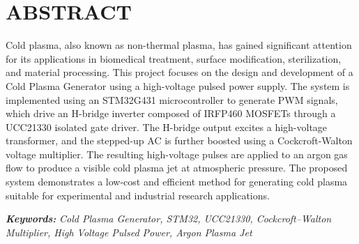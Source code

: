  \parbox[1in]{4in}{}

\section*{ABSTRACT} 

\parbox[1in]{2in}{ }


Cold plasma, also known as non-thermal plasma, has gained significant attention for its applications in biomedical treatment, surface modification, sterilization, and material processing. 
This project focuses on the design and development of a Cold Plasma Generator using a high-voltage pulsed power supply. 
The system is implemented using an STM32G431 microcontroller to generate PWM signals, which drive an H-bridge inverter composed of IRFP460 MOSFETs through a UCC21330 isolated gate driver. 
The H-bridge output excites a high-voltage transformer, and the stepped-up AC is further boosted using a Cockcroft-Walton voltage multiplier. 
The resulting high-voltage pulses are applied to an argon gas flow to produce a visible cold plasma jet at atmospheric pressure. 
The proposed system demonstrates a low-cost and efficient method for generating cold plasma suitable for experimental and industrial research applications.

\vspace{5mm} 
\noindent \textbf{\textit{Keywords:} } 
\textit{Cold Plasma Generator, STM32, UCC21330,  Cockcroft–Walton Multiplier, High Voltage Pulsed Power, Argon Plasma Jet}
